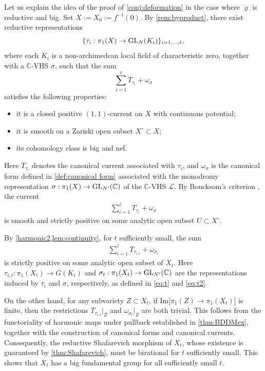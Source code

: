 \documentclass[english]{amsproc}
\theoremstyle{plain}
\theoremstyle{definition}
\theoremstyle{remark}
\theoremstyle{plain}
\numberwithin{equation}{thm} %
\newcommand{\cL}{\mathcal L}
\newcommand{\bC}{\mathbb{C}}
\newcommand{\GL}{{\rm GL}}
\begin{document}
 	Let us explain the idea of the proof of \cref{conj:deformation} in the case where
 	$\varrho$ is reductive and big.  Set $X:=X_0:=f^{-1}(0)$. By \cref{rem:byproduct}, there exist reductive
 	representations
 	\[
 	\{\tau_i:\pi_1(X)\to \GL_{N}(K_i)\}_{i=1,\ldots,\ell},
 	\]
 	where each $K_i$ is a non-archimedean local field of characteristic zero, together
 	with a $\bC$-VHS $\sigma$, such that the sum
 	\[
 	\sum_{i=1}^{\ell} T_{\tau_i}+\omega_\sigma
 	\]
 	satisfies the following properties:
 	\begin{itemize}
 		\item it is a closed positive $(1,1)$-current on $X$ with continuous potential;
 		\item it is smooth on a Zariski open subset $X^\circ\subset X$;
 		\item its cohomology class is big and nef.
 	\end{itemize}
 	Here $T_{\tau_i}$ denotes the canonical current associated with $\tau_i$, and
 	$\omega_\sigma$ is the canonical form defined in \cref{def:canonical form}
 	associated with the monodromy representation
 	$\sigma:\pi_1(X)\to \GL_{N'}(\bC)$ of the $\bC$-VHS $\cL$.
 	By Boucksom’s criterion \cite{Bou02}, the current
\begin{align*} 
	 \sum_{i=1}^{\ell} T_{\tau_i}+\omega_\sigma
\end{align*} 
 	is smooth and strictly positive on some analytic open subset
 	$U\subset X^\circ$.
 	
 	By \cref{harmonic2,lem:continuity}, for $t$ sufficiently small, the sum
\begin{align}\label{eq:current}
 	\sum_{i=1}^{\ell} T_{\tau_{i,t}}+\omega_{\sigma_t}
\end{align}
 	is strictly positive on some analytic open subset of $X_t$.
 	Here $\tau_{i,t}:\pi_1(X_t)\to G(K_i)$ and
 	$\sigma_t:\pi_1(X_t)\to \GL_{N'}(\bC)$ are the representations induced by
 	$\tau_i$ and $\sigma$, respectively, as defined in
 	\eqref{eq:t} and \eqref{eq:t2}.
 	
 	On the other hand, for any subvariety $Z\subset X_t$, if
 $
 	\mathrm{Im}\bigl[\pi_1(Z)\to \pi_1(X_t)\bigr]
$ 
 	is finite, then the restrictions $T_{\tau_{i,t}}|_Z$ and
 	$\omega_{\sigma_t}|_Z$ are both trivial. This follows from the functoriality
 	of harmonic maps under pullback established in \cref{thm:BDDMex}, together
 	with the construction of canonical forms and canonical currents.
 	Consequently, the reductive Shafarevich morphism of $X_t$, whose existence is
 	guaranteed by \cref{thm:Shafarevich}, must be birational for $t$ sufficiently
 	small. This shows that $X_t$ has a big fundamental group for all sufficiently
 	small $t$.
 	
\end{document}
